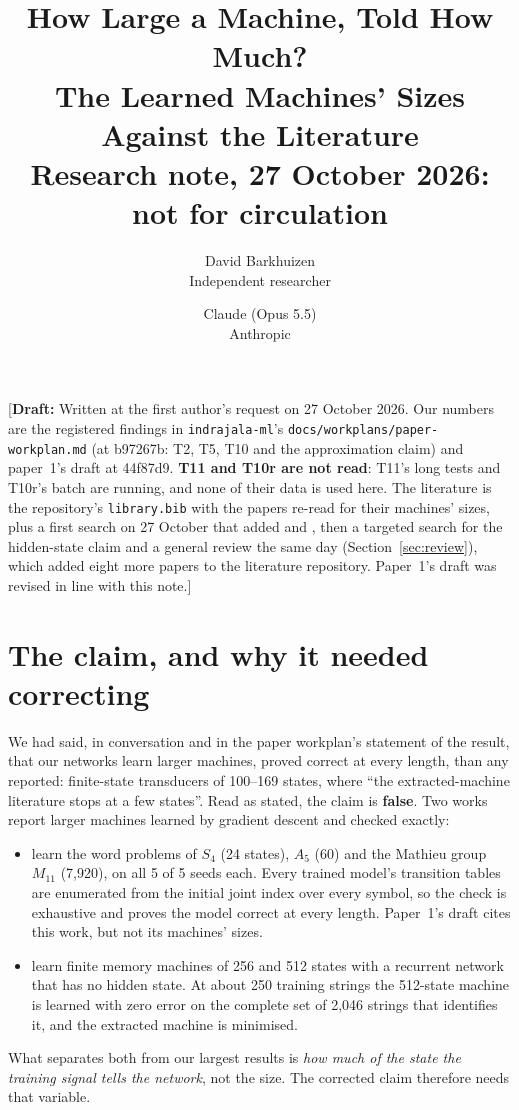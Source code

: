 \documentclass[11pt]{article}
\title{How Large a Machine, Told How Much?\\The Learned Machines' Sizes Against the Literature\\[0.5em]
\large Research note, 27 October 2026: not for circulation}
\author{
  David Barkhuizen\\
  Independent researcher
  \and
  Claude (Opus 5.5)\\
  Anthropic
}
\date{}
\newcommand{\draftnote}[1]{\textcolor{red!70!black}{[\textbf{Draft:} #1]}}
\begin{document}
\maketitle

\draftnote{Written at the first author's request on 27 October 2026. Our numbers are the registered
findings in \texttt{indrajala-ml}'s \texttt{docs/\allowbreak workplans/\allowbreak paper-workplan.md}
(at b97267b: T2, T5, T10 and the approximation claim) and paper~1's draft at 44f87d9. \textbf{T11 and
T10r are not read}: T11's long tests and T10r's batch are running, and none of their data is used
here. The literature is the repository's \texttt{library.bib} with the papers re-read for their
machines' sizes, plus a first search on 27 October that added
\citet{giles-1995-learning-class-large-finite-state-machines} and
\citet{aichernig-2024-learning-minimal-automata-rnn}, then a targeted search for the hidden-state
claim and a general review the same day (Section~\ref{sec:review}), which added eight more papers to
the literature repository. Paper~1's draft was revised in line with this note.}

\section{The claim, and why it needed correcting}

We had said, in conversation and in the paper workplan's statement of the result, that our networks
learn larger machines, proved correct at every length, than any reported: finite-state transducers of
100--169 states, where ``the extracted-machine literature stops at a few states''. Read as stated, the
claim is \textbf{false}. Two works report larger machines learned by gradient descent and checked
exactly:
\begin{itemize}
\item \citet{brandoit-2026-length-independent-state-tracking} learn the word problems of $S_4$ (24
  states), $A_5$ (60) and the Mathieu group $M_{11}$ (7{,}920), on all 5 of 5 seeds each. Every
  trained model's transition tables are enumerated from the initial joint index over every symbol, so
  the check is exhaustive and proves the model correct at every length. Paper~1's draft cites this
  work, but not its machines' sizes.
\item \citet{giles-1995-learning-class-large-finite-state-machines} learn finite memory machines of
  256 and 512 states with a recurrent network that has no hidden state. At about 250 training strings
  the 512-state machine is learned with zero error on the complete set of 2{,}046 strings that
  identifies it, and the extracted machine is minimised.
\end{itemize}
What separates both from our largest results is \emph{how much of the state the training signal
tells the network}, not the size. The corrected claim therefore needs that variable.
\end{document}

